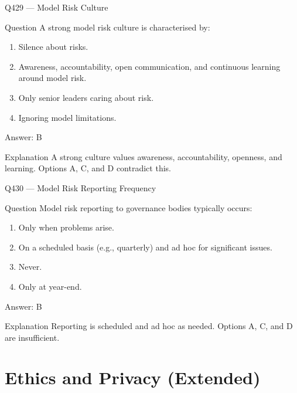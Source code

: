 \documentclass[aspectratio=169,8pt]{beamer}
\begin{document}
	\begin{frame}{Q429 --- Model Risk Culture}
		\begin{block}{Question}
			A strong model risk culture is characterised by:
			\begin{enumerate}
				\item Silence about risks.
				\item Awareness, accountability, open communication, and continuous learning around model risk.
				\item Only senior leaders caring about risk.
				\item Ignoring model limitations.
			\end{enumerate}
		\end{block}
		\begin{exampleblock}{Answer: B}\end{exampleblock}
		\begin{block}{Explanation}
			A strong culture values awareness, accountability, openness, and learning. Options A, C, and D contradict this.
		\end{block}
	\end{frame}
	
	\begin{frame}{Q430 --- Model Risk Reporting Frequency}
		\begin{block}{Question}
			Model risk reporting to governance bodies typically occurs:
			\begin{enumerate}
				\item Only when problems arise.
				\item On a scheduled basis (e.g., quarterly) and ad hoc for significant issues.
				\item Never.
				\item Only at year-end.
			\end{enumerate}
		\end{block}
		\begin{exampleblock}{Answer: B}\end{exampleblock}
		\begin{block}{Explanation}
			Reporting is scheduled and ad hoc as needed. Options A, C, and D are insufficient.
		\end{block}
	\end{frame}
	
	\section{Ethics and Privacy (Extended)}
	
\end{document}
